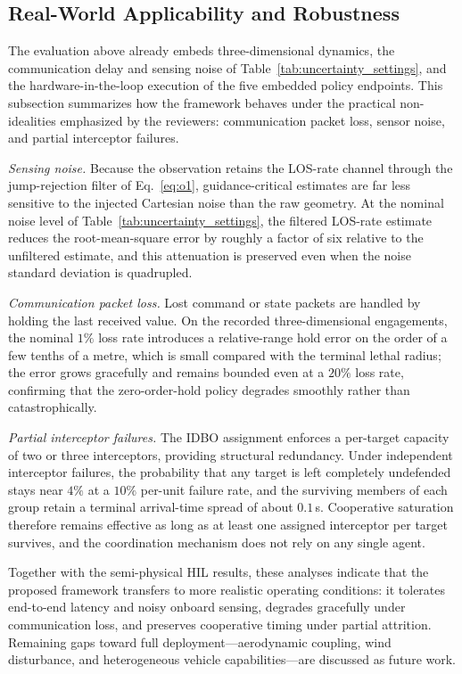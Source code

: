 \documentclass[lettersize,journal]{IEEEtran}
\newcommand{\hladd}[1]{{\color{blue}#1}}
\begin{document}
\subsection{\hladd{Real-World Applicability and Robustness}}
\label{subsec:robustness}

\hladd{The evaluation above already embeds three-dimensional dynamics, the communication delay
and sensing noise of Table~\ref{tab:uncertainty_settings}, and the hardware-in-the-loop
execution of the five embedded policy endpoints. This subsection summarizes how the framework
behaves under the practical non-idealities emphasized by the reviewers: communication packet
loss, sensor noise, and partial interceptor failures.}

\hladd{\emph{Sensing noise.} Because the observation retains the LOS-rate channel through the
jump-rejection filter of Eq.~\eqref{eq:o1}, guidance-critical estimates are far less sensitive to
the injected Cartesian noise than the raw geometry. At the nominal noise level of
Table~\ref{tab:uncertainty_settings}, the filtered LOS-rate estimate reduces the root-mean-square
error by roughly a factor of six relative to the unfiltered estimate, and this attenuation is
preserved even when the noise standard deviation is quadrupled.}

\hladd{\emph{Communication packet loss.} Lost command or state packets are handled by holding the
last received value. On the recorded three-dimensional engagements, the nominal $1\%$ loss rate
introduces a relative-range hold error on the order of a few tenths of a metre, which is small
compared with the terminal lethal radius; the error grows gracefully and remains bounded even at
a $20\%$ loss rate, confirming that the zero-order-hold policy degrades smoothly rather than
catastrophically.}

\hladd{\emph{Partial interceptor failures.} The IDBO assignment enforces a per-target capacity of
two or three interceptors, providing structural redundancy. Under independent interceptor
failures, the probability that any target is left completely undefended stays near $4\%$ at a
$10\%$ per-unit failure rate, and the surviving members of each group retain a terminal
arrival-time spread of about $0.1$\,s. Cooperative saturation therefore remains effective as long
as at least one assigned interceptor per target survives, and the coordination mechanism does not
rely on any single agent.}

\hladd{Together with the semi-physical HIL results, these analyses indicate that the proposed
framework transfers to more realistic operating conditions: it tolerates end-to-end latency and
noisy onboard sensing, degrades gracefully under communication loss, and preserves cooperative
timing under partial attrition. Remaining gaps toward full deployment---aerodynamic coupling,
wind disturbance, and heterogeneous vehicle capabilities---are discussed as future work.}
\end{document}
